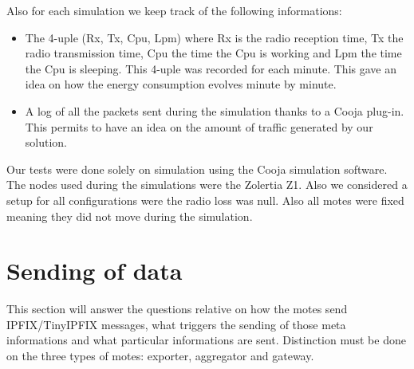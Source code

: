 Also for each simulation we keep track of the following informations:
\begin{itemize}
  \item The 4-uple (Rx, Tx, Cpu, Lpm) where Rx is the radio reception time, Tx the radio transmission time, Cpu the time the Cpu is working and Lpm the time the Cpu is sleeping. This 4-uple was recorded for each minute. This gave an idea on how the energy consumption evolves minute by minute.
  \item A log of all the packets sent during the simulation thanks to a Cooja plug-in. This permits to have an idea on the amount of traffic generated by our solution.\\
\end{itemize}

Our tests were done solely on simulation using the Cooja simulation software. The nodes used during the simulations were the Zolertia Z1. Also we considered a setup for all configurations were the radio loss was null. Also all motes were fixed meaning they did not move during the simulation.

\section{Sending of data}

This section will answer the questions relative on how the motes send IPFIX/TinyIPFIX messages, what triggers the sending of those meta informations and what particular informations are sent. Distinction must be done on the three types of motes: exporter, aggregator and gateway.\\

